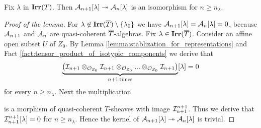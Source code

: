 \begin{lemma}\label{lemma:stabilization_for_formal_schemes}
Fix $\lambda$ in $\mathbf{Irr}(T)$. Then ${\mathcal A}_{n+1}[\lambda]\twoheadrightarrow {\mathcal A}_n[\lambda]$ is an isomorphism for $n \geq  n_{\lambda}$.
\end{lemma}
\begin{proof}[Proof of the lemma]
For $\lambda \not \in \mathbf{Irr}(\overline{T})\setminus \{\lambda_0\}$ we have ${\mathcal A}_{n+1}[\lambda] = {\mathcal A}_n[\lambda] = 0$, because ${\mathcal A}_{n+1}$ and ${\mathcal A}_n$ are quasi-coherent $\overline{T}$-algebras. Fix $\lambda \in \mathbf{Irr}(\overline{T})$. Consider an affine open subset $U$ of $Z_0$. By Lemma \ref{lemma:stablization_for_representations} and Fact \ref{fact:tensor_product_of_isotypic_components} we derive that
$$\underbrace{\left({\mathcal I}_{n+1} \otimes_{{\mathcal O}_{Z_0}} {\mathcal I}_{n+1} \otimes_{{\mathcal O}_{Z_0}}...\otimes_{{\mathcal O}_{Z_0}} {\mathcal I}_{n+1}\right)}_{n+1\,\mathrm{times}}[\lambda] = 0$$
for every $n \geq n_{\lambda}$. Next the multiplication
\begin{center}
\end{center}
is a morphism of quasi-coherent $T$-sheaves with image ${\mathcal I}_{n+1}^{n+1}$. Thus we derive that ${\mathcal I}_{n+1}^{n+1}[\lambda]=0$ for $n \geq n_{\lambda}$. Hence the kernel of ${\mathcal A}_{n+1}[\lambda]\twoheadrightarrow {\mathcal A}_n[\lambda]$ is trivial.
\end{proof}

